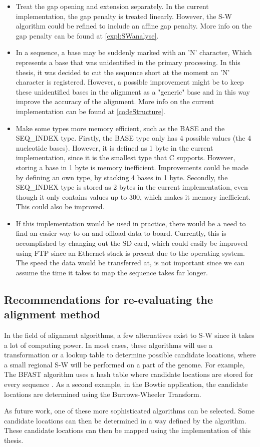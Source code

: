 \begin{itemize}
	\item Treat the gap opening and extension separately. In the current implementation, the gap penalty is treated linearly. However, the S-W algorithm could be refined to include an affine gap penalty. More info on the gap penalty can be found at \ref{expl:SWanalyse}.
	\item In a sequence, a base may be suddenly marked with an 'N' character, Which represents a base that was unidentified in the primary processing. In this thesis, it was decided to cut the sequence short at the moment an 'N' character is registered. However, a possible improvement might be to keep these unidentified bases in the alignment as a "generic" base and in this way improve the accuracy of the alignment. More info on the current implementation can be found at \ref{codeStructure}.
	\item Make some types more memory efficient, such as the BASE and the SEQ\_INDEX type. Firstly, the BASE type only has 4 possible values (the 4 nucleotide bases). However, it is defined as 1 byte in the current implementation, since it is the smallest type that C supports. However, storing a base in 1 byte is memory inefficient. Improvements could be made by defining an own type, by stacking 4 bases in 1 byte. Secondly, the SEQ\_INDEX type is stored as 2 bytes in the current implementation, even though it only contains values up to 300, which makes it memory inefficient. This could also be improved.
	\item If this implementation would be used in practice, there would be a need to find an easier way to on and offload data to board. Currently,  this is accomplished by changing out the SD card, which could easily be improved using FTP since an Ethernet stack is present due to the operating system. The speed the data would be transferred at, is not important since we can assume the time it takes to map the sequence takes far longer. 
\end{itemize}

\subsection{Recommendations for re-evaluating the alignment method}

In the field of alignment algorithms, a few alternatives exist to S-W since it takes a lot of computing power. In most cases, these algorithms will use a transformation or a lookup table to determine possible candidate locations, where a small regional S-W will be performed on a part of the genome. For example, The BFAST algorithm uses a hash table where candidate locations are stored for every sequence \cite{fpgaImpl}. As a second example, in the Bowtie application, the candidate locations are determined using the Burrows-Wheeler Transform.

As future work, one of these more sophisticated algorithms can be selected. Some candidate locations can then be determined in a way defined by the algorithm. These candidate locations can then be mapped using the implementation of this thesis.